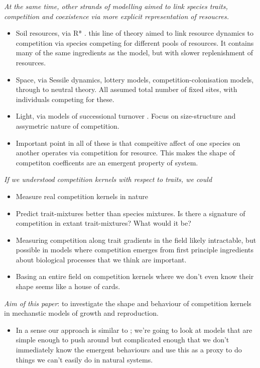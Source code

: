 \documentclass[a4paper,11pt]{article}
\begin{document}
\textit{At the same time, other strands of modelling aimed to link
  species traits, competition and coexistence via more explicit
  representation of resoucres.}
\begin{itemize}
\item Soil resources, via R* \citep{Tilman-1980,Tilman-1982}. this line of theory
  aimed to link  resource
  dynamics to competition via species competing for different pools of
  resources.  It contains many of the same ingredients as the
  \citet{MacArthur-1967} model, but with slower replenishment of
  resources.
\item Space, via Sessile dynamics, lottery models, competition-colonisation
  models, through to neutral theory. All assumed total number of fixed sites,
  with individuals competing for these.
\item Light, via models of successional turnover \citep{Huston-1987, Kohyama-1993}.
  Focus on size-structure and assymetric nature of competition.
\item Important point in all of these is that compeitive affect of one species
  on another operates via competition for resource. This makes the shape of
  competiton coefficents are an emergent  property of system.
\end{itemize}

\textit{If we understood competition kernels with respect to traits,
  we could}
\begin{itemize}
\item Measure real competition kernels in nature
\item Predict trait-mixtures better than species mixtures.  Is there a
  signature of competition in extant trait-mixtures?  What would it
  be?
\item Measuring competition along trait gradients in the field likely
  intractable, but possible in models where competition emerges from
  first principle ingredients about biological processes that we think
  are important.
\item Basing an entire field on competition kernels where we don't
  even know their shape seems like a house of cards.
\end{itemize}

\textit{Aim of this paper}: to investigate the shape and behaviour of
competition kernels in mechanstic models of growth and reproduction.
\begin{itemize}
\item In a sense our approach is similar to \citet{Draghi-2012}; we're
  going to look at models that are simple enough to push around but
  complicated enough that we don't immediately know the emergent
  behaviours and use this as a proxy to do things we can't easily do
  in natural systems.
\end{itemize}
\end{document}
